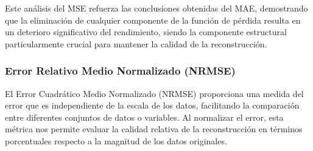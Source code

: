 Este análisis del MSE refuerza las conclusiones obtenidas del MAE, demostrando que la eliminación de cualquier componente de la función de pérdida resulta en un deterioro significativo del rendimiento, siendo la componente estructural particularmente crucial para mantener la calidad de la reconstrucción.

\subsubsection{Error Relativo Medio Normalizado (NRMSE)}


El Error Cuadrático Medio Normalizado (NRMSE) proporciona una medida del error que es independiente de la escala de los datos, facilitando la comparación entre diferentes conjuntos de datos o variables. Al normalizar el error, esta métrica nos permite evaluar la calidad relativa de la reconstrucción en términos porcentuales respecto a la magnitud de los datos originales.


